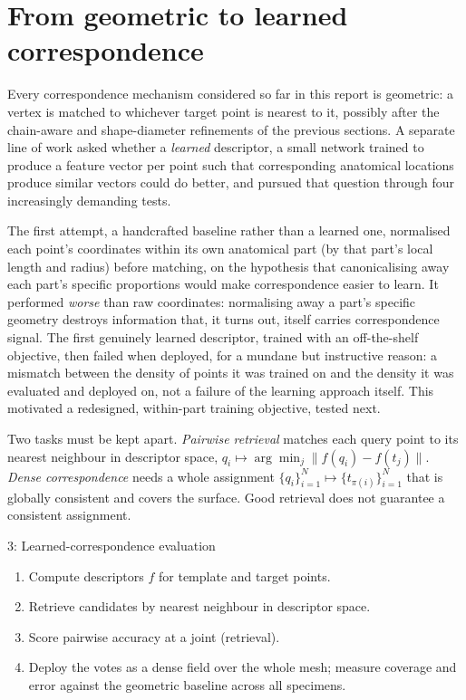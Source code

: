 \section{From geometric to learned correspondence}
\label{sec:learned-correspondence}

Every correspondence mechanism considered so far in this report is
geometric: a vertex is matched to whichever target point is nearest to it,
possibly after the chain-aware and shape-diameter refinements of the previous
sections. A separate line of work asked whether a \emph{learned}
descriptor, a small network trained to produce a feature vector per
point such that corresponding anatomical locations produce similar vectors
could do better, and pursued that question through four increasingly
demanding tests.

The first attempt, a handcrafted baseline rather than a learned one,
normalised each point's coordinates within its own anatomical part (by that
part's local length and radius) before matching, on the hypothesis that
canonicalising away each part's specific proportions would make
correspondence easier to learn. It performed \emph{worse} than raw
coordinates: normalising away a part's specific geometry destroys
information that, it turns out, itself carries correspondence signal. The
first genuinely learned descriptor, trained with an off-the-shelf objective,
then failed when deployed, for a mundane but instructive reason: a mismatch
between the density of points it was trained on and the density it was
evaluated and deployed on, not a failure of the learning approach itself.
This motivated a redesigned, within-part training objective, tested next.

Two tasks must be kept apart. \emph{Pairwise retrieval} matches each query
point to its nearest neighbour in descriptor space,
$q_i\mapsto\arg\min_j\|f(q_i)-f(t_j)\|$. \emph{Dense correspondence} needs a
whole assignment $\{q_i\}_{i=1}^N\mapsto\{t_{\pi(i)}\}_{i=1}^N$ that is
globally consistent and covers the surface. Good retrieval does not
guarantee a consistent assignment.

\begin{algbox}{3: Learned-correspondence evaluation}
\begin{enumerate}[nosep,leftmargin=1.4em]
\item Compute descriptors $f$ for template and target points.
\item Retrieve candidates by nearest neighbour in descriptor space.
\item Score pairwise accuracy at a joint (retrieval).
\item Deploy the votes as a dense field over the whole mesh; measure coverage
and error against the geometric baseline across all specimens.
\end{enumerate}
\end{algbox}

